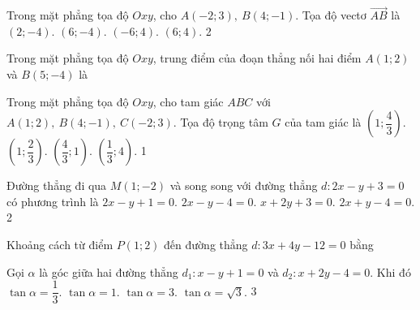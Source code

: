 \NQuestion Trong mặt phẳng tọa độ $Oxy$, cho $A(-2;3),\ B(4;-1)$. Tọa độ vectơ $\overrightarrow{AB}$ là
\ChoicesOneLine
{$(2;-4)$.}
{$(6;-4)$.}
{$(-6;4)$.}
{$(6;4)$.}
{2}

\NQuestion Trong mặt phẳng tọa độ $Oxy$, trung điểm của đoạn thẳng nối hai điểm $A(1;2)$ và $B(5;-4)$ là

\NQuestion Trong mặt phẳng tọa độ $Oxy$, cho tam giác $ABC$ với $A(1;2),\ B(4;-1),\ C(-2;3)$. Tọa độ trọng tâm $G$ của tam giác là
\ChoicesOneLine
{$\left(1;\dfrac{4}{3}\right)$.}
{$\left(1;\dfrac{2}{3}\right)$.}
{$\left(\dfrac{4}{3};1\right)$.}
{$\left(\dfrac{1}{3};4\right)$.}
{1}

\NQuestion Đường thẳng đi qua $M(1;-2)$ và song song với đường thẳng $d:2x-y+3=0$ có phương trình là
\ChoicesOneLine
{$2x-y+1=0$.}
{$2x-y-4=0$.}
{$x+2y+3=0$.}
{$2x+y-4=0$.}
{2}

\NQuestion Khoảng cách từ điểm $P(1;2)$ đến đường thẳng $d:3x+4y-12=0$ bằng

\NQuestion Gọi $\alpha$ là góc giữa hai đường thẳng $d_1:x-y+1=0$ và $d_2:x+2y-4=0$. Khi đó
\ChoicesOneLine
{$\tan\alpha=\dfrac{1}{3}$.}
{$\tan\alpha=1$.}
{$\tan\alpha=3$.}
{$\tan\alpha=\sqrt3$.}
{3}
